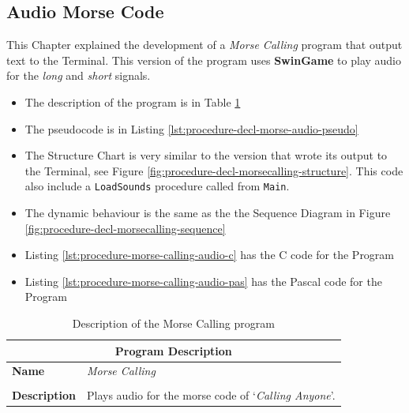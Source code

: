 


\subsection{Audio Morse Code} %
\label{sub:audio_morse_code}

This Chapter explained the development of a \emph{Morse Calling} program that output text to the Terminal. This version of the program uses \textbf{SwinGame} to play audio for the \emph{long} and \emph{short} signals.
\begin{itemize}
  \item The description of the program is in Table \ref{tbl:procedure-decl-morse-audio}
  \item The pseudocode is in Listing \ref{lst:procedure-decl-morse-audio-pseudo}
  \item The Structure Chart is very similar to the version that wrote its output to the Terminal, see Figure \ref{fig:procedure-decl-morsecalling-structure}. This code also include a \texttt{LoadSounds} procedure called from \texttt{Main}.
  \item The dynamic behaviour is the same as the the Sequence Diagram in Figure \ref{fig:procedure-decl-morsecalling-sequence}
  \item Listing \ref{lst:procedure-morse-calling-audio-c} has the C code for the Program
  \item Listing \ref{lst:procedure-morse-calling-audio-pas} has the Pascal code for the Program
\end{itemize}

\begin{table}[h]
\centering
\begin{tabular}{l|p{10cm}}
  \hline
  \multicolumn{2}{c}{\textbf{Program Description}} \\
  \hline
  \textbf{Name} & \emph{Morse Calling} \\
  \\
  \textbf{Description} & Plays audio for the morse code of `\emph{Calling Anyone}'. \\
  \hline
\end{tabular}
\caption{Description of the Morse Calling program}
\label{tbl:procedure-decl-morse-audio}
\end{table}


